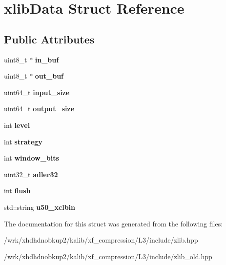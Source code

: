 \hypertarget{structxlibData}{\section{xlib\-Data Struct Reference}
\label{structxlibData}
}
\subsection*{Public Attributes}
\begin{DoxyCompactItemize}
\item 
\hypertarget{structxlibData_aae3bf4ee1c43a225f30608342c055a48}{uint8\-\_\-t $\ast$ {\bfseries in\-\_\-buf}}\label{structxlibData_aae3bf4ee1c43a225f30608342c055a48}

\item 
\hypertarget{structxlibData_ab4e50cde44c135a807b7f9b12ea62ac8}{uint8\-\_\-t $\ast$ {\bfseries out\-\_\-buf}}\label{structxlibData_ab4e50cde44c135a807b7f9b12ea62ac8}

\item 
\hypertarget{structxlibData_a7a176e85c1843a722fa47cb82d759b07}{uint64\-\_\-t {\bfseries input\-\_\-size}}\label{structxlibData_a7a176e85c1843a722fa47cb82d759b07}

\item 
\hypertarget{structxlibData_ad4e9193559fc872f3ed148ddb3b32062}{uint64\-\_\-t {\bfseries output\-\_\-size}}\label{structxlibData_ad4e9193559fc872f3ed148ddb3b32062}

\item 
\hypertarget{structxlibData_ae9403a54b065162b97a38588e85bc32f}{int {\bfseries level}}\label{structxlibData_ae9403a54b065162b97a38588e85bc32f}

\item 
\hypertarget{structxlibData_a80237a47cdb64fe118a8b6eb34c45e07}{int {\bfseries strategy}}\label{structxlibData_a80237a47cdb64fe118a8b6eb34c45e07}

\item 
\hypertarget{structxlibData_a822c511d79a90b76ac605299260e7ded}{int {\bfseries window\-\_\-bits}}\label{structxlibData_a822c511d79a90b76ac605299260e7ded}

\item 
\hypertarget{structxlibData_a60f13588ad585222601a2bcac3380ab0}{uint32\-\_\-t {\bfseries adler32}}\label{structxlibData_a60f13588ad585222601a2bcac3380ab0}

\item 
\hypertarget{structxlibData_a9c4814f8637fa6929fcc40f3632908d5}{int {\bfseries flush}}\label{structxlibData_a9c4814f8637fa6929fcc40f3632908d5}

\item 
\hypertarget{structxlibData_a357a9a7ecd00182a9aa6c9f1222221ba}{std\-::string {\bfseries u50\-\_\-xclbin}}\label{structxlibData_a357a9a7ecd00182a9aa6c9f1222221ba}

\end{DoxyCompactItemize}


The documentation for this struct was generated from the following files\-:\begin{DoxyCompactItemize}
\item 
/wrk/xhdhdnobkup2/kalib/xf\-\_\-compression/\-L3/include/zlib.\-hpp\item 
/wrk/xhdhdnobkup2/kalib/xf\-\_\-compression/\-L3/include/zlib\-\_\-old.\-hpp\end{DoxyCompactItemize}
